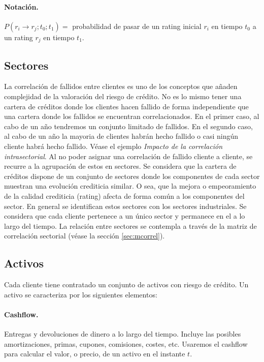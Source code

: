 \paragraph{Notaci\'on.} $P(r_i \to r_j;t_0;t_1) =$ probabilidad de pasar de un 
rating inicial $r_i$ en tiempo $t_0$ a un rating $r_j$ en tiempo $t_1$.


\subsection{Sectores}

La correlaci\'on de fallidos entre clientes es uno de los conceptos que
a\~naden complejidad de la valoraci\'on del riesgo de cr\'edito. No es lo
mismo tener una cartera de cr\'editos donde los clientes hacen fallido 
de forma independiente que una cartera donde los fallidos se encuentran 
correlacionados. En el primer caso, al cabo de un a\~no tendremos un 
conjunto limitado de fallidos. En el segundo caso, al cabo de un a\~no la 
mayoria de clientes habr\'an hecho fallido o casi ning\'un cliente habr\'a
hecho fallido. V\'ease el ejemplo \emph{Impacto de la correlaci\'on intrasectorial}.
\newline
\newline
Al no poder asignar una correlaci\'on de fallido cliente a cliente, se recurre
a la agrupaci\'on de estos en sectores. Se considera que la cartera de 
cr\'editos dispone de un conjunto de sectores donde los componentes de cada 
sector muestran una evoluci\'on crediticia similar. O sea, que la mejora o 
empeoramiento de la calidad crediticia (rating) afecta de forma com\'un a los 
componentes del sector. En general se identifican estos sectores con los 
sectores industriales. 
\newline
\newline
Se considera que cada cliente pertenece a un \'unico sector y permanece en 
el a lo largo del tiempo. La relaci\'on entre sectores se contempla a trav\'es 
de la matriz de correlaci\'on sectorial (v\'ease la secci\'on \ref{sec:mcorrel}).

\subsection{Activos}

Cada cliente tiene contratado un conjunto de activos con riesgo de cr\'edito.
Un activo se caracteriza por los siguientes elementos:

\paragraph{Cashflow.} Entregas y devoluciones de dinero a lo largo del tiempo. 
Incluye las posibles amortizaciones, primas, cupones, comisiones, costes, etc. 
Usaremos el cashflow para calcular el valor, o precio, de un activo en el 
instante $t$.

